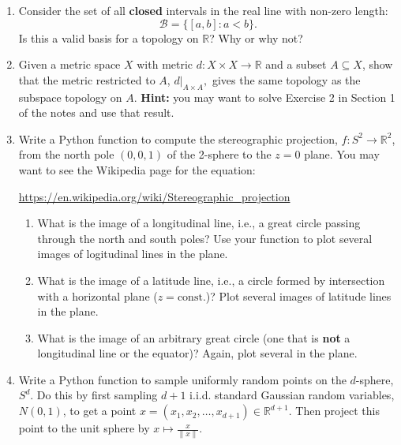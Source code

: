 \documentclass[11pt]{article}
\begin{document}
\begin{enumerate}

\item Consider the set of all {\bf closed} intervals in the real line with
  non-zero length:
  $$\mathcal{B} = \{[a, b] : a < b\}.$$
  Is this a valid basis for a topology on $\mathbb{R}$? Why or why not?

\item Given a metric space $X$ with metric
  $d : X \times X \rightarrow \mathbb{R}$ and a subset $A \subseteq X$, show
  that the metric restricted to $A$, $d |_{A \times A},$ gives the same topology
  as the subspace topology on $A$. {\bf Hint:} you may want to solve Exercise 2
  in Section 1 of the notes and use that result.

\item Write a Python function to compute the stereographic projection,
  $f: S^2 \rightarrow \mathbb{R}^2$, from the north pole $(0,0,1)$ of the
  2-sphere to the $z = 0$ plane. You may want to see the Wikipedia page for the
  equation:
  \begin{center}
    \url{https://en.wikipedia.org/wiki/Stereographic_projection}
  \end{center}

  \begin{enumerate}
  \item What is the image of a longitudinal line, i.e., a great circle passing
    through the north and south poles? Use your function to plot several images
    of logitudinal lines in the plane.

  \item What is the image of a latitude line, i.e., a circle formed by
    intersection with a horizontal plane ($z = \mathrm{const.}$)? Plot several
    images of latitude lines in the plane.

  \item What is the image of an arbitrary great circle (one that is {\bf not} a
    longitudinal line or the equator)? Again, plot several in the plane.
  \end{enumerate}

\item Write a Python function to sample uniformly random points on the
  $d$-sphere, $S^d$. Do this by first sampling $d+1$ i.i.d. standard Gaussian
  random variables, $N(0,1)$, to get a point
  $x = (x_1, x_2, \ldots, x_{d+1}) \in \mathbb{R}^{d+1}$. Then project this
  point to the unit sphere by $x \mapsto \frac{x}{\|x\|}$.


\end{enumerate}
\end{document}
